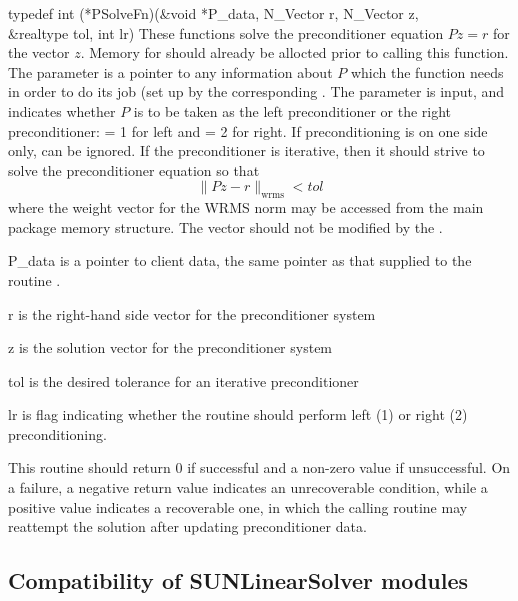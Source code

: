 {
  typedef int (*PSolveFn)(&void *P\_data, N\_Vector r, N\_Vector z, \\
                          &realtype tol, int lr)
}
{
  These functions solve the preconditioner equation $Pz = r$
  for the vector $z$.  Memory for  should already be
  allocted prior to calling this function.  The
  parameter  is a pointer to any information about $P$
  which the function needs in order to do its job (set up by the
  corresponding . The parameter  is input, and
  indicates whether $P$ is to be taken as the left preconditioner or
  the right preconditioner:  = 1 for left and  = 2 for
  right.  If preconditioning is on one side only,  can be
  ignored.  If the preconditioner is iterative, then it should strive
  to solve the preconditioner equation so that 
  \[
      \| Pz - r \|_{\text{wrms}} < tol
  \]
  where the weight vector for the WRMS norm may be accessed from the
  main package memory structure.  The vector  should not be
  modified by the .  
}
{
  \begin{args}
  \item[P\_data]
    is a pointer to client data, the same pointer as that supplied to the routine .
  \item[r]
    is the right-hand side vector for the preconditioner system
  \item[z]
    is the solution vector for the preconditioner system
  \item[tol]
    is the desired tolerance for an iterative preconditioner
  \item[lr]
    is flag indicating whether the routine should perform left (1) or
    right (2) preconditioning.
  \end{args}
}
{  
  This routine should return 0 if successful and a non-zero value if
  unsuccessful.  On a failure, a negative return value indicates an
  unrecoverable condition, while a positive value indicates a
  recoverable one, in which the calling routine may reattempt the
  solution after updating preconditioner data.
}
{
}


\subsection{Compatibility of SUNLinearSolver modules}\label{ss:sunlinsol_clientsupplied}


